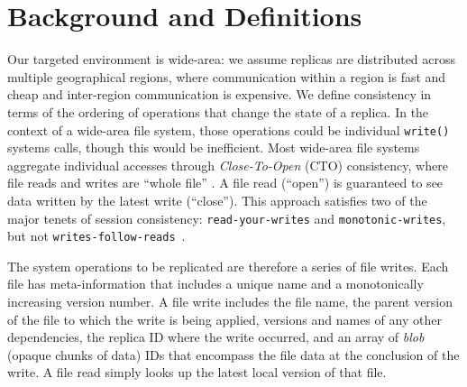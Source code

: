 \documentclass[10pt,conference,letterpaper]{IEEEtran}
\newcommand{\todo}[1]{{\textcolor{red}{#1}}}
\newcommand{\pjk}[1]{[\todo{PJK: #1}]}
\begin{document}
\section{Background and Definitions}
\label{sec:background}

Our targeted environment is wide-area: we assume
replicas are distributed across
multiple geographical regions, where communication within a region is fast and
cheap and inter-region communication is expensive.
We define consistency in terms of the ordering of operations that change the
state of a replica.
In the context of a wide-area file system, those operations could be individual
\texttt{write()} systems calls, though this would be inefficient.
Most wide-area file systems aggregate individual accesses through
\textit{Close-To-Open} (CTO) consistency, where file reads and writes are
``whole file'' \cite{afs,coda,lbfs}.
A file read (``open'') is guaranteed to see data written by the latest write
(``close'').
This approach satisfies two of the major tenets of session consistency:
\texttt{read-your-writes} and
\texttt{monotonic-writes}, but not
\texttt{writes-follow-reads}~\cite{bermbach_consistency_2013,terry_session_1994,vogels_eventually_2009}.

The system operations to be replicated are therefore a series of file writes.
Each file has meta-information that includes a unique name and a monotonically
increasing version number.
A file write includes the file name, the parent version of the file to which the write is being applied,
versions and names of any other dependencies, the replica ID where the write
occurred, and an array of \emph{blob} (opaque chunks of data) IDs that encompass the file data at
the conclusion of the write.
A file read simply looks up the latest local version of that file.

\end{document}
